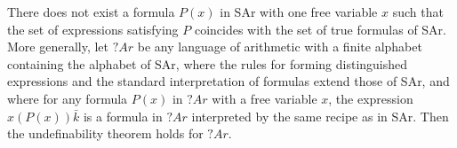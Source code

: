 There does not exist a formula $P(x)$ in SAr with one free variable $x$ such that the set of expressions satisfying $P$ coincides with the set of true formulas of SAr. More generally, let $?Ar$ be any language of arithmetic with a finite alphabet containing the alphabet of SAr, where the rules for forming distinguished expressions and the standard interpretation of formulas extend those of SAr, and where for any formula $P(x)$ in $?Ar$ with a free variable $x$, the expression $x(P(x))\bar{k}$ is a formula in $?Ar$ interpreted by the same recipe as in SAr. Then the undefinability theorem holds for $?Ar$.
